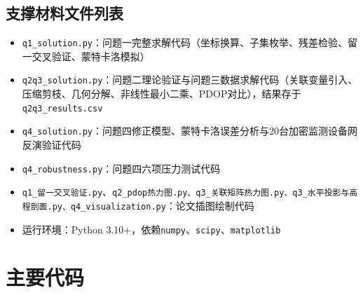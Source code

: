 \documentclass[draft,12pt,a4paper]{ctexart}
\theoremstyle{definition}
\begin{document}
\subsection{支撑材料文件列表}
\begin{itemize}[itemsep=1pt]
  \item \texttt{q1\_solution.py}：问题一完整求解代码（坐标换算、子集枚举、残差检验、留一交叉验证、蒙特卡洛模拟）
  \item \texttt{q2q3\_solution.py}：问题二理论验证与问题三数据求解代码（关联变量引入、压缩剪枝、几何分解、非线性最小二乘、PDOP对比），结果存于\texttt{q2q3\_results.csv}
  \item \texttt{q4\_solution.py}：问题四修正模型、蒙特卡洛误差分析与20台加密监测设备网反演验证代码
  \item \texttt{q4\_robustness.py}：问题四六项压力测试代码
  \item \texttt{q1\_留一交叉验证.py}、\texttt{q2\_pdop热力图.py、q3\_关联矩阵热力图.py、q3\_水平投影与高程剖面.py、q4\_visualization.py}：论文插图绘制代码
  \item 运行环境：Python 3.10+，依赖\texttt{numpy}、\texttt{scipy}、\texttt{matplotlib}
\end{itemize}

\section{主要代码}\label{app:code}
\end{document}
